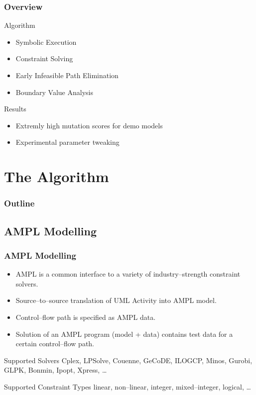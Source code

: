 \documentclass{beamer}
\begin{document}
\begin{frame}
\frametitle{Overview}
\begin{block}{Algorithm}
\begin{itemize}
\item Symbolic Execution
\item Constraint Solving
\item Early Infeasible Path Elimination
\item Boundary Value Analysis
\end{itemize}
\end{block}
\begin{block}{Results}
\begin{itemize}
\item Extremly high mutation scores for demo models
\item Experimental parameter tweaking
\end{itemize}
\end{block}
\end{frame}

\section{The Algorithm}
\begin{frame}
\frametitle{Outline} \tableofcontents[currentsection]
\end{frame}

\subsection{AMPL Modelling}
\begin{frame}
\frametitle{AMPL Modelling}
\begin{itemize}
  \item AMPL is a common interface to a variety of industry--strength constraint
  solvers.
  \item Source--to--source translation of UML Activity into AMPL model.
  \item Control--flow path is specified as AMPL data.
  \item Solution of an AMPL program (model + data) contains test data for a
  certain control--flow path.
\end{itemize}
\begin{block}{Supported Solvers} 
Cplex, LPSolve, Couenne, GeCoDE, ILOGCP, Minos, Gurobi, GLPK, Bonmin, Ipopt,
Xpress, \ldots
\end{block}
\begin{block}{Supported Constraint Types}
linear, non--linear, integer, mixed--integer, logical, \ldots
\end{block} 
\end{frame}
\end{document}
